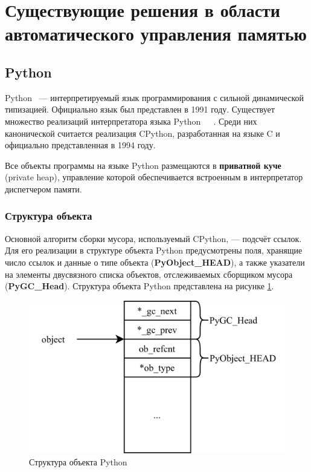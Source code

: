 \section*{Существующие решения в области автоматического управления памятью}

\subsection*{Python}

Python~\cite{python} --- интерпретируемый язык программирования с сильной динамической типизацией. Официально язык был представлен в 1991 году. Существует множество реализаций интерпретатора языка Python~\cite{juthon}~\cite{ironpython}~\cite{pypy}. Среди них канонической считается реализация CPython, разработанная на языке C и официально представленная в 1994 году.~\cite{cpython}

Все объекты программы на языке Python размещаются в \textbf{приватной куче} (private heap), управление которой обеспечивается встроенным в интерпретатор диспетчером памяти.~\cite{python_memory}

\subsubsection*{Структура объекта}

Основной алгоритм сборки мусора, используемый CPython, --- подсчёт ссылок. Для его реализации в структуре объекта Python предусмотрены поля, хранящие число ссылок и данные о типе объекта (\textbf{PyObject\_HEAD}), а также указатели на элементы двусвязного списка объектов, отслеживаемых сборщиком мусора (\textbf{PyGC\_Head}). Структура объекта Python представлена на рисунке \ref{fig:pyobject}.~\cite{python_gc}

\begin{figure}[H]
	\centering
	\includegraphics[scale=0.27]{assets/python-object.png}
	\caption{Структура объекта Python}
	\label{fig:pyobject}
\end{figure}

